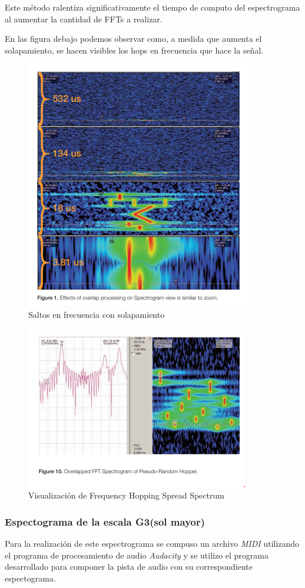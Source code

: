 Este método ralentiza significativamente el tiempo de computo del espectrograma al aumentar la cantidad de FFTs a realizar.

En las figura debajo podemos observar como, a medida que aumenta el solapamiento, se hacen visibles los hops en frecuencia que hace la señal.
\begin{figure}[H]
	\centering
	\includegraphics[width=0.7\linewidth]{ImagenesEjercicio7/Zoooom}
	\caption{Saltos en frecuencia con solapamiento}
	\label{fig:zoooom}
\end{figure}



\begin{figure}[H]
	\centering
	\includegraphics[width=0.7\linewidth]{ImagenesEjercicio7/Zoooom2}
	\caption{Visualización de Frequency Hopping Spread Spectrum}
	\label{fig:zoooom2}
\end{figure}


\subsubsection{Espectograma de la escala G3(sol mayor)}
Para la realización de este espectrograma se compuso un archivo \textit{MIDI} utilizando el programa de procesamiento de audio \textit{Audacity} y se utilizo el programa desarrollado para componer la pista de audio con su correspondiente espectograma.

